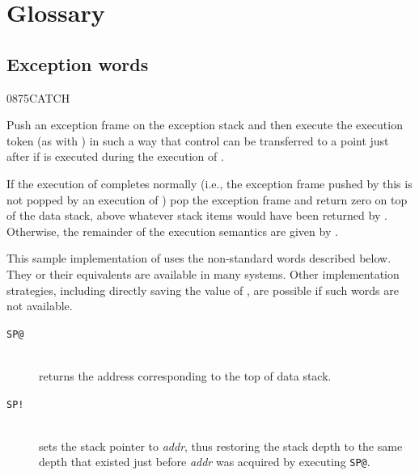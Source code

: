 \setcounter{section}{5}
\section{Glossary} %
\vspace{1ex}

\subsection{Exception words} %
\vspace{1ex}
\begin{worddef}{0875}{CATCH}
\item {}

	Push an exception frame on the exception stack and then execute
	the execution token  (as with ) in
	such a way that control can be transferred to a point just after
	 if  is executed during the execution of
	.

	If the execution of  completes normally (i.e., the
	exception frame pushed by this  is not popped by an
	execution of ) pop the exception frame and return
	zero on top of the data stack, above whatever stack items would
	have been returned by  . Otherwise,
	the remainder of the execution semantics are given by
	.


	\begin{implement} %
	\dffamily
		This sample implementation of  uses the non-standard
		words described below.  They or their equivalents are available in many
		systems.  Other implementation strategies, including directly saving the
		value of , are possible if such words are not available.

		\begin{description}
		\item[\texttt{SP@}]  \\
			returns the address corresponding to the top of data stack.

		\item[\texttt{SP!}]  \\
			sets the stack pointer to \emph{addr}, thus restoring the stack
			depth to the same depth that existed just before \emph{addr} was
			acquired by executing \texttt{SP@}.


\end{description}
\end{implement}
\end{worddef}
